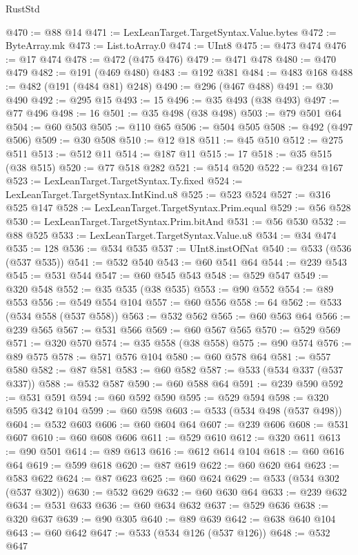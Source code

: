 \begin{lexlean}{RustStd}
\begin{coremodule}
{\begin{coremodule}
{{{{{{{{{{{{{{{{{{{{{{{{{{{{{{{{@470 := @88 @14
@471 := LexLeanTarget.TargetSyntax.Value.bytes
@472 := ByteArray.mk
@473 := List.toArray.{0}
@474 := UInt8
@475 := @473 @474
@476 := @17 @474
@478 := @472 (@475 @476)
@479 := @471 @478
@480 := @470 @479
@482 := @191 (@469 @480)
@483 := @192 @381
@484 := @483 @168
@488 := @482 (@191 (@484 @81) @248)
@490 := @296 (@467 @488)
@491 := @30 @490
@492 := @295 @15
@493 := 15
@496 := @35 @493 (@38 @493)
@497 := @77 @496
@498 := 16
@501 := @35 @498 (@38 @498)
@503 := @79 @501 @64
@504 := @60 @503
@505 := @110 @65
@506 := @504 @505
@508 := @492 (@497 @506)
@509 := @30 @508
@510 := @12 @18
@511 := @45 @510
@512 := @275 @511
@513 := @512 @11
@514 := @187 @11
@515 := 17
@518 := @35 @515 (@38 @515)
@520 := @77 @518 @282
@521 := @514 @520
@522 := @234 @167
@523 := LexLeanTarget.TargetSyntax.Ty.fixed
@524 := LexLeanTarget.TargetSyntax.IntKind.u8
@525 := @523 @524
@527 := @316 @525 @147
@528 := LexLeanTarget.TargetSyntax.Prim.equal
@529 := @56 @528
@530 := LexLeanTarget.TargetSyntax.Prim.bitAnd
@531 := @56 @530
@532 := @88 @525
@533 := LexLeanTarget.TargetSyntax.Value.u8
@534 := @34 @474
@535 := 128
@536 := @534 @535
@537 := UInt8.instOfNat
@540 := @533 (@536 (@537 @535))
@541 := @532 @540
@543 := @60 @541 @64
@544 := @239 @543
@545 := @531 @544
@547 := @60 @545 @543
@548 := @529 @547
@549 := @320 @548
@552 := @35 @535 (@38 @535)
@553 := @90 @552
@554 := @89 @553
@556 := @549 @554 @104
@557 := @60 @556
@558 := 64
@562 := @533 (@534 @558 (@537 @558))
@563 := @532 @562
@565 := @60 @563 @64
@566 := @239 @565
@567 := @531 @566
@569 := @60 @567 @565
@570 := @529 @569
@571 := @320 @570
@574 := @35 @558 (@38 @558)
@575 := @90 @574
@576 := @89 @575
@578 := @571 @576 @104
@580 := @60 @578 @64
@581 := @557 @580
@582 := @87 @581
@583 := @60 @582
@587 := @533 (@534 @337 (@537 @337))
@588 := @532 @587
@590 := @60 @588 @64
@591 := @239 @590
@592 := @531 @591
@594 := @60 @592 @590
@595 := @529 @594
@598 := @320 @595 @342 @104
@599 := @60 @598
@603 := @533 (@534 @498 (@537 @498))
@604 := @532 @603
@606 := @60 @604 @64
@607 := @239 @606
@608 := @531 @607
@610 := @60 @608 @606
@611 := @529 @610
@612 := @320 @611
@613 := @90 @501
@614 := @89 @613
@616 := @612 @614 @104
@618 := @60 @616 @64
@619 := @599 @618
@620 := @87 @619
@622 := @60 @620 @64
@623 := @583 @622
@624 := @87 @623
@625 := @60 @624
@629 := @533 (@534 @302 (@537 @302))
@630 := @532 @629
@632 := @60 @630 @64
@633 := @239 @632
@634 := @531 @633
@636 := @60 @634 @632
@637 := @529 @636
@638 := @320 @637
@639 := @90 @305
@640 := @89 @639
@642 := @638 @640 @104
@643 := @60 @642
@647 := @533 (@534 @126 (@537 @126))
@648 := @532 @647
}}}}}}}}}}}}}}}}}}}}}}}}}}}}}}}}
\end{coremodule}}
\end{coremodule}
\end{lexlean}
